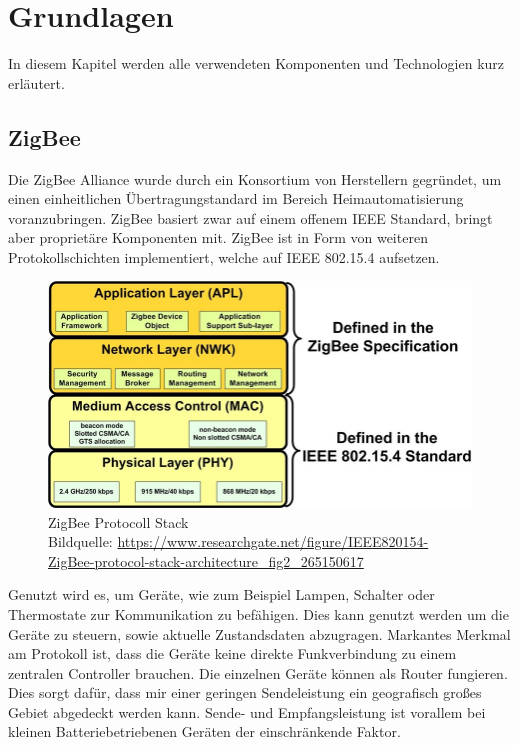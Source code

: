 \chapter{Grundlagen}

In diesem Kapitel werden alle verwendeten Komponenten und Technologien kurz erläutert.

\section{ZigBee}

Die ZigBee Alliance wurde durch ein Konsortium von Herstellern gegründet, um einen einheitlichen Übertragungstandard
im Bereich Heimautomatisierung voranzubringen. ZigBee basiert zwar auf einem offenem IEEE Standard, bringt aber proprietäre Komponenten mit.
ZigBee ist in Form von weiteren Protokollschichten implementiert, welche auf IEEE 802.15.4 aufsetzen.

\begin{figure}[H]
  \centering
  \includegraphics[width=1\textwidth]{media/Zigbee Stack.jpg}
  \caption{ZigBee Protocoll Stack \\ Bildquelle: \url{https://www.researchgate.net/figure/IEEE820154-ZigBee-protocol-stack-architecture_fig2_265150617}}
\end{figure}

Genutzt wird es, um Geräte, wie zum Beispiel Lampen, Schalter oder Thermostate
zur Kommunikation zu befähigen. Dies kann genutzt werden um die Geräte zu steuern, sowie aktuelle Zustandsdaten abzugragen. 
Markantes Merkmal am Protokoll ist, dass die Geräte keine direkte Funkverbindung
zu einem zentralen Controller brauchen. Die einzelnen Geräte können als Router fungieren. Dies sorgt dafür,
dass mir einer geringen Sendeleistung ein geografisch großes Gebiet abgedeckt werden kann. Sende- und Empfangsleistung
ist vorallem bei kleinen Batteriebetriebenen Geräten der einschränkende Faktor.


